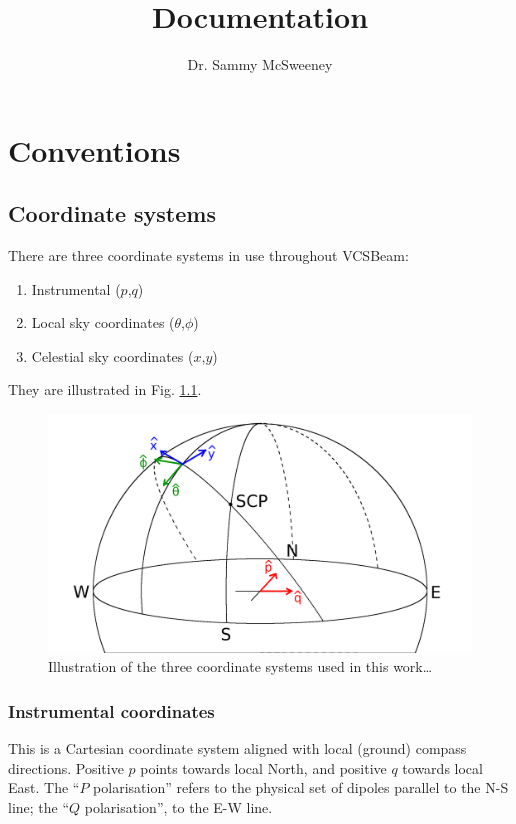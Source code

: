 \documentclass{book}
\title{\vcsbeam{} Documentation}
\author{Dr. Sammy McSweeney}
\newcommand{\vcsbeam}{{\sc VCSBeam}}
\begin{document}
\maketitle

\tableofcontents

\chapter{Conventions}

\section{Coordinate systems}

There are three coordinate systems in use throughout \vcsbeam{}:
\begin{enumerate}
    \item Instrumental ($p$,$q$)
    \item Local sky coordinates ($\theta$,$\phi$)
    \item Celestial sky coordinates ($x$,$y$)
\end{enumerate}
They are illustrated in Fig. \ref{fig:coords}.
\begin{figure}[!bh]
    \centering
    \includegraphics[width=\textwidth]{coords.png}
    \caption{Illustration of the three coordinate systems used in this work\dots}
    \label{fig:coords}
\end{figure}

\subsection{Instrumental coordinates}

This is a Cartesian coordinate system aligned with local (ground) compass directions.
Positive $p$ points towards local North, and positive $q$ towards local East.
The ``$P$ polarisation'' refers to the physical set of dipoles parallel to the N-S line; the ``$Q$ polarisation'', to the E-W line.
\end{document}
